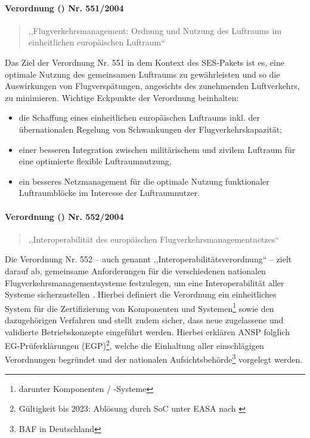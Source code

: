 \paragraph{Verordnung () Nr. 551/2004} \label{er_551}
    \begin{quote}
        ,,Flugverkehrsmanagement: Ordnung und Nutzung des Luftraums im einheitlichen europäischen Luftraum``
        \cite{2004R0551, 2004R0551_summary}
    \end{quote}

    \noindent
    Das Ziel der Verordnung Nr. 551 in dem Kontext des \ac{SES}-Pakets ist es, eine optimale Nutzung des gemeinsamen Luftraums zu gewährleisten und so die Auswirkungen von Flugverspätungen, angesichts des zunehmenden Luftverkehrs, zu minimieren. 
    Wichtige Eckpunkte der Verordnung beinhalten: 
    
    \begin{itemize}
        \item die Schaffung eines einheitlichen europäischen Luftraums inkl. der übernationalen Regelung von Schwankungen der Flugverkehrskapazität;
        \item  einer besseren Integration zwischen militärischem und zivilem Luftraum für eine optimierte flexible Luftraumnutzung,
        \item ein besseres Netzmanagement für die optimale Nutzung funktionaler Luftraumblöcke im Interesse der Luftraumnutzer. \cite{2004R0551_summary}
    \end{itemize}

\paragraph{Verordnung () Nr. 552/2004} \label{er_552}
    \begin{quote}
        ,,Interoperabilität des europäischen Flugverkehrsmanagement\-netzes``
        \cite{2004R0552, 2004R0552_summary}
    \end{quote}
    
    \noindent
    Die Verordnung Nr. 552 -- auch genannt ,,Interoperabilitätsverordnung`` -- zielt darauf ab, gemeinsame Anforderungen für die verschiedenen nationalen Flugverkehrsmanagementsysteme festzulegen, um eine Interoperabilität aller Systeme sicherzustellen
    \cite{2004R0552_summary}.
    Hierbei definiert die Verordnung ein einheitliches System für die Zertifizierung von Komponenten und Systemen\footnote{darunter \atmans{} Komponenten / -Systeme} sowie den dazugehörigen Verfahren und stellt zudem sicher, dass neue zugelassene und validierte Betriebskonzepte eingeführt werden. \cite[Art.3 Abs.1]{2004R0552}
    Hierbei erklären \ac{ANSP} folglich \acs{EG}-Prüferklärungen (\acs{EGP})\footnote{Gültigkeit bis 2023: Ablösung durch \ac{SoC} unter \acs{EASA} nach  \cite{2023R1769}}, welche die Einhaltung aller einschlägigen Verordnungen begründet und der nationalen Aufsichtsbehörde\footnote{\acf{BAF} in Deutschland} vorgelegt werden. \cite[Art. 6 Abs. 1f]{2004R0552}

